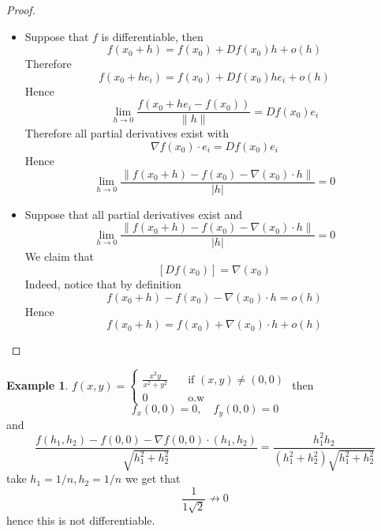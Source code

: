 \documentclass[11pt,a4paper]{article}
\theoremstyle{definition}
\newtheorem{example}[definition]{Example}
\theoremstyle{plain}
\theoremstyle{remark}
\newcommand{\norm}[1]{\lVert #1 \rVert}
\begin{document}
\begin{proof}
    \begin{itemize}
        \item[$\implies$] Suppose that $f$ is differentiable, then 
        $$f(x_0 + h) = f(x_0) + Df(x_0) h + o(h)$$
        Therefore 
        $$f(x_0 + he_i) = f(x_0) + Df(x_0)h e_i + o(h)$$
        Hence 
        $$\lim_{h \to 0} \frac{f(x_0 + he_i - f(x_0))}{\norm{h}} = Df(x_0) e_i$$
        Therefore all partial derivatives exist with 
        $$\nabla f (x_0) \cdot e_i = Df(x_0) e_i$$
        Hence 
        $$\lim_{h \to 0} \frac{\norm{f(x_0 + h )- f(x_0) - \nabla (x_0) \cdot h}}{|h|} = 0$$

        \item[$\impliedby$] Suppose that all partial derivatives exist and 
        $$\lim_{h \to 0} \frac{\norm{f(x_0 + h) - f(x_0) - \nabla (x_0) \cdot h}}{|h|} = 0$$
        We claim that 
        $$[Df(x_0)] = \nabla(x_0)$$
        Indeed, notice that by definition
        $$f(x_0 + h) - f(x_0) - \nabla (x_0) \cdot h = o(h)$$ 
        Hence 
        $$f(x_0 + h) = f(x_0) + \nabla (x_0) \cdot h + o(h)$$
    \end{itemize}
\end{proof}

\begin{example}
    $f(x,y) = \begin{cases}
        \frac{x^2 y}{x^2 + y^2} \quad &\text{if } (x,y) \ne (0,0) \\
        0\quad&\text{o.w}
    \end{cases}$ then 
    $$f_x (0,0) = 0, \quad f_y(0,0) = 0$$
    and 
    $$\frac{f(h_1,h_2) - f(0,0) - \nabla f(0,0) \cdot (h_1, h_2)}{\sqrt{h_1^2 + h_2^2}} = \frac{h_1^2 h_2}{(h_1^2 + h_2^2) \sqrt{h_1^2 + h_2^2}}$$
    take $h_1 = 1/n, h_2 = 1/n$ we get that 
    $$\frac{1}{1 \sqrt{2}} \not\to 0$$
    hence this is not differentiable. 
\end{example}
\end{document}
